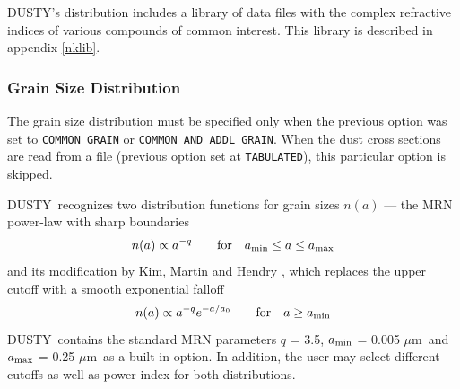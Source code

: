 \documentclass[11pt]{article}
\def\D  {{\sf DUSTY}}
\def\eq#1{\begin{equation} #1 \end{equation}}
\def\mic    {\hbox{$\mu$m}}
\begin{document}
\D's distribution includes a library of data files with the complex refractive
indices of various compounds of common interest. This library is described in
appendix \ref{nklib}.


\subsubsection{Grain Size Distribution}

The grain size distribution must be specified only when the previous option was
set to {\tt COMMON\_GRAIN} or {\tt COMMON\_AND\_ADDL\_GRAIN}.  When the dust
cross sections are read from a file (previous option set at {\tt TABULATED}),
this particular option is skipped.

\D\ recognizes two distribution functions for grain sizes $n(a)$ --- the MRN
\cite{MRN77} power-law with sharp boundaries
\eq{
         n(a) \propto a^{-q} \qquad \hbox{for} \quad
                a_{\rm min} \le a \le a_{\rm max}
}
and its modification by Kim, Martin and Hendry \cite{KMH94}, which replaces the
upper cutoff with a smooth exponential falloff
\eq{
  n(a) \propto a^{-q} e^{-a/a_0} \qquad \hbox{for} \quad a \ge a_{\rm min}
}
\D\ contains the standard MRN parameters $q$ = 3.5, $a_{\rm min}$ = 0.005 \mic\
and $a_{\rm max}$ = 0.25 \mic\ as a built-in option.  In addition, the user may
select different cutoffs as well as power index for both distributions.
\end{document}
